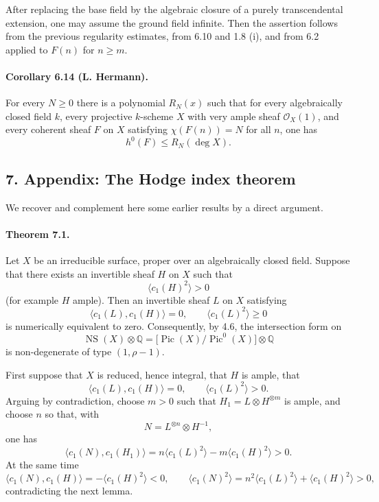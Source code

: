 \documentclass[12pt]{article}
\newcommand{\QQ}{\mathbb Q}
\newcommand{\cO}{\mathcal O}
\newcommand{\Pic}{\operatorname{Pic}}
\newcommand{\NS}{\operatorname{NS}}
\begin{document}
After replacing the base field by the algebraic closure of a purely transcendental extension, one may assume the ground field infinite. Then the assertion follows from the previous regularity estimates, from 6.10 and 1.8 (i), and from 6.2 applied to $F(n)$ for $n\geq m$.

\paragraph{Corollary 6.14 (L. Hermann).}
For every $N\geq 0$ there is a polynomial $R_N(x)$ such that for every algebraically closed field $k$, every projective $k$-scheme $X$ with very ample sheaf $\cO_X(1)$, and every coherent sheaf $F$ on $X$ satisfying $\chi(F(n))=N$ for all $n$, one has
\[
h^0(F)\leq R_N(\deg X).
\]

\subsection*{7. Appendix: The Hodge index theorem}

We recover and complement here some earlier results by a direct argument.

\paragraph{Theorem 7.1.}
Let $X$ be an irreducible surface, proper over an algebraically closed field. Suppose that there exists an invertible sheaf $H$ on $X$ such that
\[
\langle c_1(H)^2\rangle>0
\]
(for example $H$ ample). Then an invertible sheaf $L$ on $X$ satisfying
\[
\langle c_1(L),c_1(H)\rangle=0,\qquad
\langle c_1(L)^2\rangle\geq 0
\]
is numerically equivalent to zero. Consequently, by 4.6, the intersection form on
\[
\NS(X)\otimes\QQ=\bigl[\Pic(X)/\Pic^0(X)\bigr]\otimes\QQ
\]
is non-degenerate of type $(1,\rho-1)$.

First suppose that $X$ is reduced, hence integral, that $H$ is ample, that
\[
\langle c_1(L),c_1(H)\rangle=0,\qquad
\langle c_1(L)^2\rangle>0.
\]
Arguing by contradiction, choose $m>0$ such that $H_1=L\otimes H^{\otimes m}$ is ample, and choose $n$ so that, with
\[
N=L^{\otimes n}\otimes H^{-1},
\]
one has
\[
\langle c_1(N),c_1(H_1)\rangle
 =n\langle c_1(L)^2\rangle-m\langle c_1(H)^2\rangle>0.
\]
At the same time
\[
\langle c_1(N),c_1(H)\rangle=-\langle c_1(H)^2\rangle<0,\qquad
\langle c_1(N)^2\rangle=n^2\langle c_1(L)^2\rangle+\langle c_1(H)^2\rangle>0,
\]
contradicting the next lemma.
\end{document}
